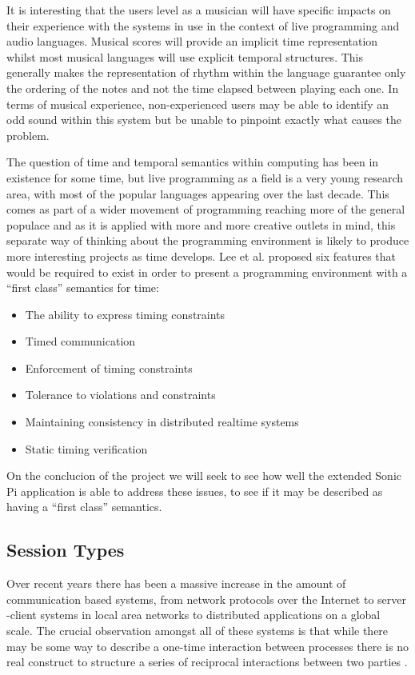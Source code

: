 \documentclass[11pt]{scrartcl}
\begin{document}
It is interesting that the users level as a musician will have specific 
impacts on their experience with the systems in use in the context of live 
programming and audio languages. Musical scores will provide an implicit time 
representation whilst most musical languages will use explicit temporal 
structures. This generally makes the representation of rhythm within the 
language guarantee only the ordering of the notes and not the time elapsed 
between playing each one. In terms of musical experience, non-experienced 
users may be able to identify an odd sound within this system but be unable to 
pinpoint exactly what causes the problem. 

The question of time and temporal semantics within computing has been in 
existence for some time, but live programming as a field is a very young 
research area, with most of the popular languages appearing over the last 
decade. This comes as part of a wider movement of programming reaching more of 
the general populace and as it is applied with more and more creative outlets 
in mind, this separate way of thinking about the programming environment is 
likely to produce more interesting projects as time develops. Lee et al. \cite{LDW87} proposed six features that would be required to exist in order to present a programming environment with a ``first class'' semantics for time:

\begin{itemize}
	\item The ability to express timing constraints
	\item Timed communication
	\item Enforcement of timing constraints
	\item Tolerance to violations and constraints
	\item Maintaining consistency in distributed realtime systems
	\item Static timing verification
\end{itemize}

On the conclucion of the project we will seek to see how well the extended Sonic Pi application is able to address these issues, to see if it may be described as having a ``first class'' semantics.

\subsection{Session Types}
Over recent years there has been a massive increase in the amount of 
communication based systems, from network protocols over the Internet to server
-client systems in local area networks to distributed applications on a global 
scale. The crucial observation amongst all of these systems is that while 
there may be some way to describe a one-time interaction between processes 
there is no real construct to structure a series of reciprocal interactions 
between two parties \cite{HVM98}.
\end{document}
